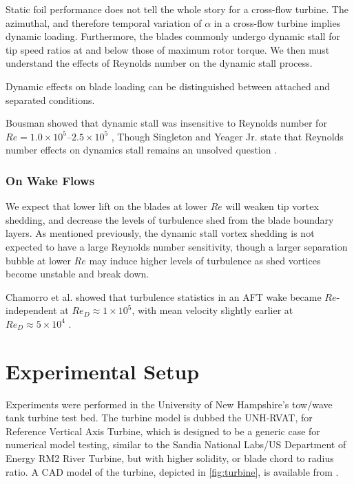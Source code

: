 \documentclass[energies,article,accept,moreauthors,pdftex,12pt,a4paper]{mdpi}
\begin{document}
Static foil performance does not tell the whole story for a cross-flow turbine.
The azimuthal, and therefore temporal variation of $\alpha$ in a cross-flow
turbine implies dynamic loading. Furthermore, the blades commonly undergo
dynamic stall for tip speed ratios at and below those of maximum rotor
torque\cite{Para2002}. We then must understand the effects of Reynolds number on
the dynamic stall process.

Dynamic effects on blade loading can be distinguished between attached and
separated conditions. 


Bousman showed that dynamic stall was insensitive to Reynolds number for $Re=1.0
\times 10^5$--$2.5 \times 10^5$ \cite{Bousman2000-evaluation}, Though Singleton
and Yeager Jr. state that Reynolds number effects on dynamics stall remains an
unsolved question \cite{Singleton2000}.

\subsubsection{On Wake Flows}

We expect that lower lift on the blades at lower $Re$ will weaken tip vortex
shedding, and decrease the levels of turbulence shed from the blade boundary
layers. As mentioned previously, the dynamic stall vortex shedding is not
expected to have a large Reynolds number sensitivity, though a larger separation
bubble at lower $Re$ may induce higher levels of turbulence as shed vortices
become unstable and break down.


Chamorro et al. showed that turbulence statistics in an AFT wake became
$Re$-independent at $Re_D \approx 1 \times 10^5$, with mean velocity slightly
earlier at $Re_D \approx 5 \times 10^4$ \cite{Chamorro2012}.

\section{Experimental Setup}

Experiments were performed in the University of New Hampshire's tow/wave tank
turbine test bed. The turbine model is dubbed the UNH-RVAT, for Reference
Vertical Axis Turbine, which is designed to be a generic case for numerical
model testing, similar to the Sandia National Labs/US Department of Energy RM2
River Turbine, but with higher solidity, or blade chord to radius ratio. A CAD
model of the turbine, depicted in \ref{fig:turbine}, is available from
\cite{Bachant2014-RVAT-CAD}.
\end{document}

